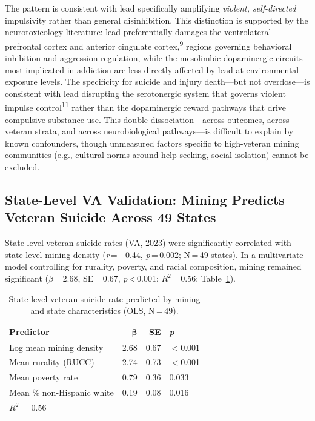 \documentclass[11pt,twocolumn]{article}
\begin{document}
The pattern is consistent with lead specifically amplifying \textit{violent, self-directed} impulsivity rather than general disinhibition. This distinction is supported by the neurotoxicology literature: lead preferentially damages the ventrolateral prefrontal cortex and anterior cingulate cortex,\textsuperscript{9} regions governing behavioral inhibition and aggression regulation, while the mesolimbic dopaminergic circuits most implicated in addiction are less directly affected by lead at environmental exposure levels. The specificity for suicide and injury death---but not overdose---is consistent with lead disrupting the serotonergic system that governs violent impulse control\textsuperscript{11} rather than the dopaminergic reward pathways that drive compulsive substance use. This double dissociation---across outcomes, across veteran strata, and across neurobiological pathways---is difficult to explain by known confounders, though unmeasured factors specific to high-veteran mining communities (e.g., cultural norms around help-seeking, social isolation) cannot be excluded.


\subsection{State-Level VA Validation: Mining Predicts Veteran Suicide Across 49 States}

State-level veteran suicide rates (VA, 2023) were significantly correlated with state-level mining density (\textit{r}\,=\,+0.44, \textit{p}\,=\,0.002; N\,=\,49 states). In a multivariate model controlling for rurality, poverty, and racial composition, mining remained significant ($\beta$\,=\,2.68, SE\,=\,0.67, \textit{p}\,<\,0.001; $R^2$\,=\,0.56; Table~\ref{tab:statemodel}).

\begin{table}[H]
\centering
\small
\caption{State-level veteran suicide rate predicted by mining and state characteristics (OLS, N\,=\,49).}
\label{tab:statemodel}
\begin{tabular}{@{}lrrl@{}}
\toprule
\textbf{Predictor} & $\boldsymbol{\beta}$ & \textbf{SE} & \textbf{\textit{p}} \\
\midrule
Log mean mining density & 2.68 & 0.67 & $<$0.001 \\
Mean rurality (RUCC) & 2.74 & 0.73 & $<$0.001 \\
Mean poverty rate & 0.79 & 0.36 & 0.033 \\
Mean \% non-Hispanic white & 0.19 & 0.08 & 0.016 \\
\midrule
$R^2$ = 0.56 & & & \\
\bottomrule
\end{tabular}
\end{table}
\end{document}
